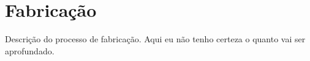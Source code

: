\chapter{Fabricação}
Descrição do processo de fabricação. Aqui eu não tenho certeza o quanto vai ser aprofundado.  